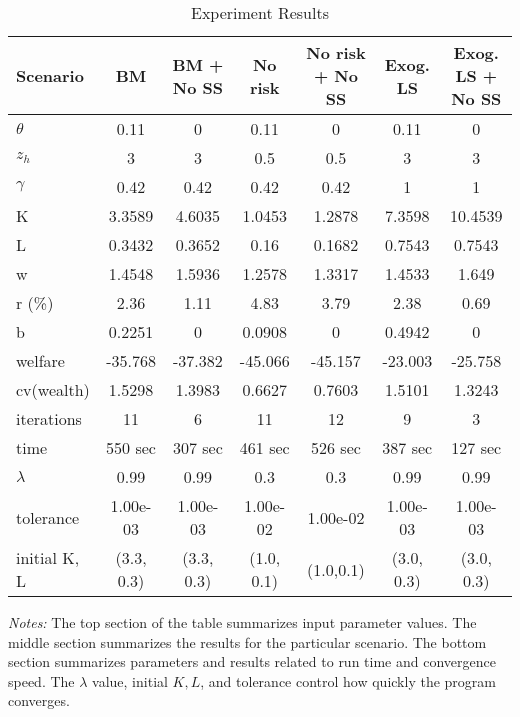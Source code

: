 \begin{table}[!htbp]
\small
\begin{center}
\caption{Experiment Results} \medskip
\begin{tabular}{@{}lcccccc@{}}
\toprule
Scenario & BM         & BM + No SS & No risk    & No risk + No SS & Exog. LS   & Exog. LS + No SS \\ \midrule
$\theta$            & 0.11       & 0          & 0.11       & 0               & 0.11       & 0                \\
$z_h$             & 3          & 3          & 0.5        & 0.5             & 3          & 3                \\
$\gamma$            & 0.42       & 0.42       & 0.42       & 0.42            & 1          & 1                \\
\midrule
K                & 3.3589     & 4.6035     & 1.0453     & 1.2878          & 7.3598     & 10.4539          \\
L                & 0.3432     & 0.3652     & 0.16       & 0.1682          & 0.7543     & 0.7543           \\
w                & 1.4548     & 1.5936     & 1.2578     & 1.3317          & 1.4533     & 1.649            \\
r (\%)               & 2.36     & 1.11      & 4.83     & 3.79          & 2.38     & 0.69           \\
b                & 0.2251     & 0          & 0.0908     & 0               & 0.4942     & 0                \\
welfare          & -35.768    & -37.382    & -45.066    & -45.157         & -23.003    & -25.758          \\
cv(wealth)       & 1.5298     & 1.3983     & 0.6627     & 0.7603          & 1.5101     & 1.3243           \\
\midrule
iterations       & 11         & 6          & 11         & 12              & 9          & 3                \\
time             & 550 sec    & 307 sec    & 461 sec    & 526 sec         & 387 sec    & 127 sec          \\
$\lambda$           & 0.99       & 0.99       & 0.3        & 0.3             & 0.99       & 0.99             \\
tolerance        & 1.00e-03   & 1.00e-03   & 1.00e-02   & 1.00e-02        & 1.00e-03   & 1.00e-03         \\
initial K, L     & (3.3, 0.3) & (3.3, 0.3) & (1.0, 0.1) & (1.0,0.1)       & (3.0, 0.3) & (3.0, 0.3)       \\ \bottomrule
\end{tabular}
\end{center}
\label{tab} \par \medskip
{\footnotesize \textit{Notes: } The top section of the table summarizes input parameter values. The middle section summarizes the results for the particular scenario. The bottom section summarizes parameters and results related to run time and convergence speed. The $\lambda$ value, initial $K, L$, and tolerance control how quickly the program converges.}
\end{table}